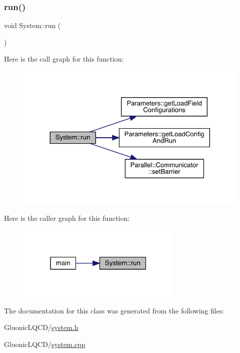\subsubsection{\texorpdfstring{run()}{run()}}
{\footnotesize\ttfamily void System\+::run (\begin{DoxyParamCaption}{ }\end{DoxyParamCaption})}

Here is the call graph for this function\+:
\nopagebreak
\begin{figure}[H]
\begin{center}
\leavevmode
\includegraphics[width=324pt]{class_system_afa39feb75f96798930f4bfb48205f40b_cgraph}
\end{center}
\end{figure}
Here is the caller graph for this function\+:
\nopagebreak
\begin{figure}[H]
\begin{center}
\leavevmode
\includegraphics[width=223pt]{class_system_afa39feb75f96798930f4bfb48205f40b_icgraph}
\end{center}
\end{figure}


The documentation for this class was generated from the following files\+:\begin{DoxyCompactItemize}
\item 
Gluonic\+L\+Q\+C\+D/\mbox{\hyperlink{system_8h}{system.\+h}}\item 
Gluonic\+L\+Q\+C\+D/\mbox{\hyperlink{system_8cpp}{system.\+cpp}}\end{DoxyCompactItemize}
